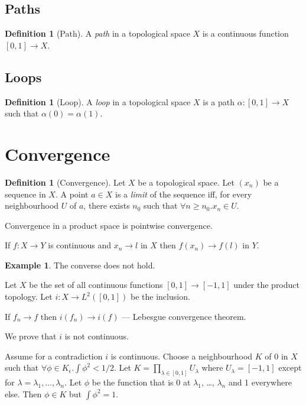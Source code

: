 \documentclass{book}
\theoremstyle{definition}
\newtheorem{df}[ax]{Definition}
\newtheorem{ex}[ax]{Example}
\begin{document}
\subsection{Paths}

\begin{df}[Path]
A \emph{path} in a topological space $X$ is a continuous function $[0,1] \rightarrow X$.
\end{df}

\subsection{Loops}

\begin{df}[Loop]
A \emph{loop} in a topological space $X$ is a path $\alpha : [0,1] \rightarrow X$ such that $\alpha(0) = \alpha(1)$.
\end{df}

\section{Convergence}

\begin{df}[Convergence]
Let $X$ be a topological space. Let $(x_n)$ be a sequence in $X$. A point $a \in X$ is a \emph{limit} of the sequence iff, for every neighbourhood $U$ of $a$, there exists $n_0$ such that $\forall n \geq n_0. x_n \in U$.
\end{df}

Convergence in a product space is pointwise convergence.

If $f : X \rightarrow Y$ is continuous and $x_n \rightarrow l$ in $X$ then $f(x_n) \rightarrow f(l)$ in $Y$.

\begin{ex}
The converse does not hold.

Let $X$ be the set of all continuous functions $[0,1] \rightarrow [-1,1]$ under the product topology. Let $i : X \rightarrow L^2([0,1])$ be the inclusion.

If $f_n \rightarrow f$ then $i(f_n) \rightarrow i(f)$ --- Lebesgue convergence theorem.

We prove that $i$ is not continuous.

Assume for a contradiction $i$ is continuous. Choose a neighbourhood $K$ of 0 in $X$ such that $\forall \phi \in K _\epsilon. \int \phi^2 < 1/2$. Let $K = \prod_{\lambda \in [0,1]} U_\lambda$ where $U_\lambda = [-1,1]$ except for $\lambda = \lambda_1, \ldots, \lambda_n$. Let $\phi$ be the function that is 0 at $\lambda_1$, \ldots, $\lambda_n$ and 1 everywhere else. Then $\phi \in K$ but $\int \phi^2 = 1$.
\end{ex}
\end{document}
